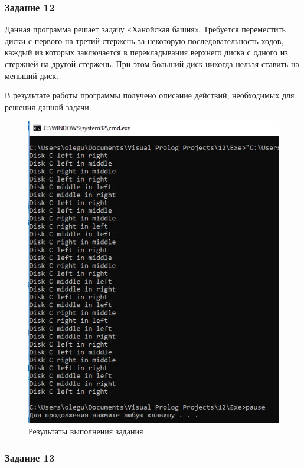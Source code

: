 \documentclass[14pt,a4paper,report]{report}
\begin{document}
\subsubsection{Задание 12}

Данная программа решает задачу «Ханойская башня». Требуется переместить диски с первого на третий стержень за некоторую последовательность ходов, каждый из которых заключается в перекладывания верхнего диска с одного из стержней на другой стержень. При этом больший диск никогда нельзя ставить на меньший диск.

В результате работы программы получено описание действий, необходимых для решения данной задачи.



\begin{figure}[h!]
	\centering
	\includegraphics[scale = 0.9]{images/d12.png}
	\caption{Результаты выполнения задания}
\end{figure}
\clearpage
\subsubsection{Задание 13}
\end{document}
